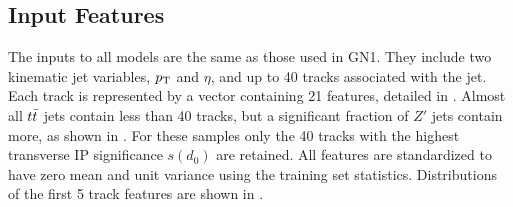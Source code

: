 \subsection{Input Features}

The inputs to all models are the same as those used in GN1.
They include two kinematic jet variables, $p_{\text{T}}$ and $\eta$, and up to 40 tracks associated with the jet.
Each track is represented by a vector containing 21 features, detailed in .
Almost all $t\bar{t}$ jets contain less than 40 tracks, but a significant fraction of $Z'$ jets contain more, as shown in .
For these samples only the 40 tracks with the highest transverse IP significance $s(d_0)$ are retained.
All features are standardized to have zero mean and unit variance using the training set statistics.
Distributions of the first 5 track features are shown in .

